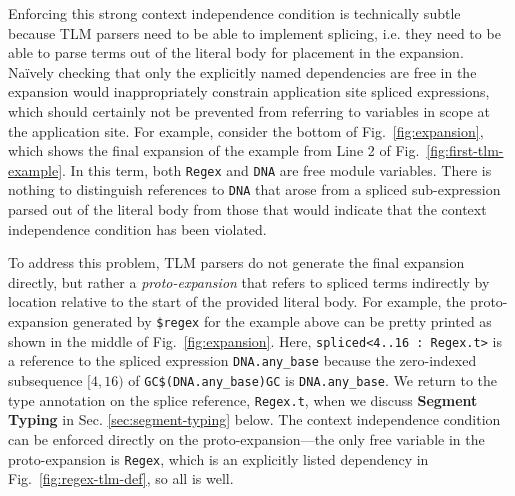 \documentclass[acmsmall]{acmart}
\newcommand{\li}[1]{\lstinline[basicstyle=\ttfamily\fontsize{9pt}{1em}\selectfont]{#1}}
\newcommand{\lismall}[1]{\lstinline[basicstyle=\ttfamily\fontsize{9pt}{1em}\selectfont]{#1}}
\begin{document}
Enforcing this strong context independence condition is technically subtle because TLM parsers need to be able to implement splicing, i.e. they need to be able to parse  terms out of the literal body for placement in the expansion. Na\"ively checking that only the explicitly named dependencies are free in the expansion would inappropriately constrain application site spliced expressions, which should certainly not be prevented from referring to variables in scope at the application site. For example, consider the  bottom of Fig.~\ref{fig:expansion}, which shows the final expansion of the example from Line 2 of Fig.~\ref{fig:first-tlm-example}. 
In this term, both \li{Regex} and \li{DNA} are free module variables. There is nothing to distinguish references to \li{DNA} that arose from a spliced sub-expression parsed out of the literal body from those that would indicate that the context independence condition has been violated. 

To address this problem, TLM parsers do not generate the final expansion directly, but rather a \emph{proto-expansion} that refers to spliced terms indirectly by location relative to the start of the provided literal body. For example, the proto-expansion generated by \li{$regex} for the example above can be pretty printed as shown in the middle of Fig.~\ref{fig:expansion}. 
Here, \lismall{spliced<4..16 : Regex.t>} is a reference to the spliced expression \li{DNA.any_base} because the zero-indexed subsequence $[4, 16)$ of \lismall{GC$(DNA.any_base)GC} is \lismall{DNA.any_base}. We return to the type annotation on the splice reference, \li{Regex.t}, when we discuss \textbf{Segment Typing} in Sec. \ref{sec:segment-typing} below. The context independence condition can be enforced directly on the proto-expansion---the only free variable in the proto-expansion is \li{Regex}, which is an explicitly listed dependency in Fig.~\ref{fig:regex-tlm-def}, so all is well. 
\end{document}

